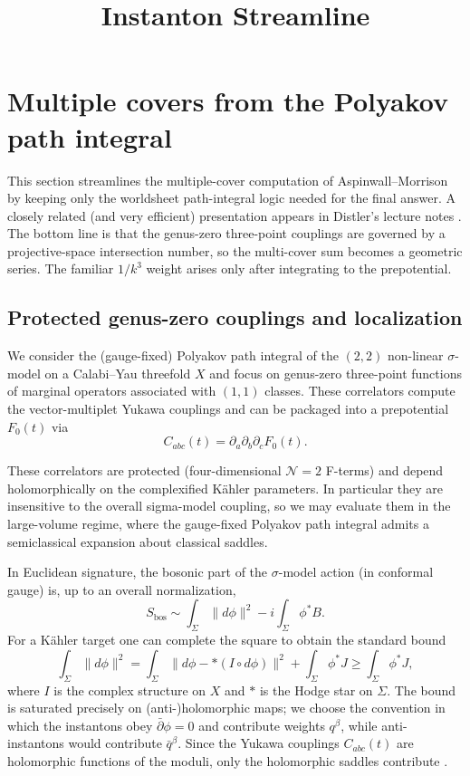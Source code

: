 \documentclass[12pt]{article}
\begin{document}
\title{Instanton Streamline}

\section{Multiple covers from the Polyakov path integral}
\label{sec:multiple-covers-polyakov}

This section streamlines the multiple-cover computation of Aspinwall--Morrison
\cite{AspinwallMorrison:1991tft} by keeping only the worldsheet path-integral
logic needed for the final answer. A closely related (and very efficient)
presentation appears in Distler's lecture notes \cite{Distler:1992n2}. The
bottom line is that the genus-zero three-point couplings are governed by a
projective-space intersection number, so the multi-cover sum becomes a geometric
series. The familiar $1/k^3$ weight arises only after integrating to the
prepotential.

\subsection{Protected genus-zero couplings and localization}
We consider the (gauge-fixed) Polyakov path integral of the $(2,2)$ non-linear
$\sigma$-model on a Calabi--Yau threefold $X$ and focus on genus-zero three-point
functions of marginal operators associated with $(1,1)$ classes. These
correlators compute the vector-multiplet Yukawa couplings and can be packaged
into a prepotential $F_0(t)$ via
\begin{equation}
  C_{abc}(t)=\partial_a\partial_b\partial_c F_0(t).
\end{equation}

These correlators are protected (four-dimensional $\mathcal{N}=2$ F-terms) and
depend holomorphically on the complexified K\"ahler parameters. In particular
they are insensitive to the overall sigma-model coupling, so we may evaluate
them in the large-volume regime, where the gauge-fixed Polyakov path integral
admits a semiclassical expansion about classical saddles.

In Euclidean signature, the bosonic part of the $\sigma$-model action (in
conformal gauge) is, up to an overall normalization,
\begin{equation}
  S_{\mathrm{bos}}\sim \int_\Sigma \|d\phi\|^2 - i\int_\Sigma \phi^*B.
\end{equation}
For a K\"ahler target one can complete the square to obtain the standard bound
\begin{equation}
  \int_\Sigma \|d\phi\|^2
  = \int_\Sigma \|d\phi - * (I\circ d\phi)\|^2 + \int_\Sigma \phi^*J
  \ge \int_\Sigma \phi^*J,
\end{equation}
where $I$ is the complex structure on $X$ and $*$ is the Hodge star on $\Sigma$.
The bound is saturated precisely on (anti-)holomorphic maps; we choose the
convention in which the instantons obey $\bar\partial\phi=0$ and contribute
weights $q^\beta$, while anti-instantons would contribute $\bar q^\beta$. Since
the Yukawa couplings $C_{abc}(t)$ are holomorphic functions of the moduli, only
the holomorphic saddles contribute \cite{Distler:1992n2,AspinwallMorrison:1991tft}.
\end{document}
